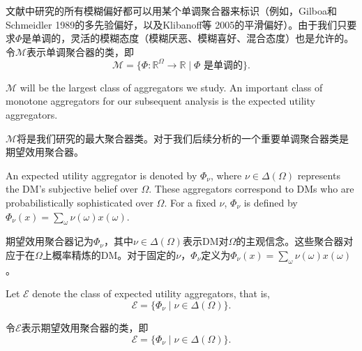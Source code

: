 \documentclass[12pt,a4paper]{article}
\newenvironment{original}
  {\par\vspace{4pt}\noindent\color{black}\ignorespaces}
  {\par\vspace{2pt}}
\newenvironment{translation}
  {\par\vspace{2pt}\noindent\color{myblue}\ignorespaces}
  {\par\vspace{6pt}}
\newcommand{\R}{\mathbb{R}}
\newcommand{\Delt}{\Delta}
\newcommand{\calM}{\mathcal{M}}
\newcommand{\calE}{\mathcal{E}}
\begin{document}
\begin{translation}
文献中研究的所有模糊偏好都可以用某个单调聚合器来标识（例如，Gilboa和Schmeidler 1989的多先验偏好，以及Klibanoff等 2005的平滑偏好）。由于我们只要求$\Phi$是单调的，灵活的模糊态度（模糊厌恶、模糊喜好、混合态度）也是允许的。令$\calM$表示单调聚合器的类，即
\begin{equation}
    \calM = \{\Phi:\R^{\Omega}\to\R \mid \Phi \text{ 是单调的}\}. \label{eq:calM}
\end{equation}
\end{translation}

\begin{original}
$\calM$ will be the largest class of aggregators we study. An important class of monotone aggregators for our subsequent analysis is the expected utility aggregators.
\end{original}

\begin{translation}
$\calM$将是我们研究的最大聚合器类。对于我们后续分析的一个重要单调聚合器类是期望效用聚合器。
\end{translation}

\begin{original}
An expected utility aggregator is denoted by $\Phi_{\nu}$, where $\nu\in\Delt(\Omega)$ represents the DM's subjective belief over $\Omega$. These aggregators correspond to DMs who are probabilistically sophisticated over $\Omega$. For a fixed $\nu$, $\Phi_{\nu}$ is defined by $\Phi_{\nu}(x)=\sum_{\omega}\nu(\omega)x(\omega)$.
\end{original}

\begin{translation}
期望效用聚合器记为$\Phi_{\nu}$，其中$\nu\in\Delt(\Omega)$表示DM对$\Omega$的主观信念。这些聚合器对应于在$\Omega$上概率精炼的DM。对于固定的$\nu$，$\Phi_{\nu}$定义为$\Phi_{\nu}(x)=\sum_{\omega}\nu(\omega)x(\omega)$。
\end{translation}

\begin{original}
Let $\calE$ denote the class of expected utility aggregators, that is,
\begin{equation}
    \calE = \{\Phi_{\nu} \mid \nu\in\Delt(\Omega)\}. \label{eq:calE}
\end{equation}
\end{original}

\begin{translation}
令$\calE$表示期望效用聚合器的类，即
\begin{equation}
    \calE = \{\Phi_{\nu} \mid \nu\in\Delt(\Omega)\}. \label{eq:calE}
\end{equation}
\end{translation}
\end{document}
